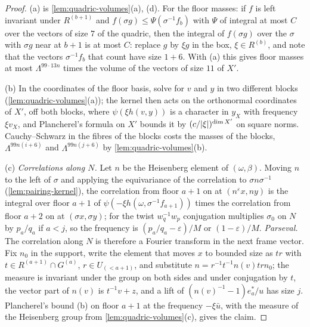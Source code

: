 \begin{proof}
(a) is \cref{lem:quadric-volumes}(a), (d). For the floor masses: if $f$ is left invariant under $R^{(b+1)}$ and $f(\sigma g)\le\Psi(\sigma^{-1}f_b)$ with $\Psi$ of integral at most $C$ over the vectors of size $7$ of the quadric, then the integral of
$f(\sigma g)$ over the $\sigma$ with $\sigma g$ near at $b+1$ is at most $C$: replace $g$ by $\xi g$ in the box, $\xi\in R^{(b)}$, and note that the vectors $\sigma^{-1}f_b$ that count have size $1+6$. With (a) this gives floor masses at most $\Lambda^{99\cdot13n}$ times
the volume of the vectors of size $11$ of $X'$.

(b) In the coordinates of the floor basis, solve for $v$ and $y$ in two different blocks (\cref{lem:quadric-volumes}(a)); the kernel then acts on the orthonormal coordinates of $X'$, off both blocks, where $\psi(\xi h(v,y))$ is a
character in $y_X$ with frequency $\xi v_X$, and Plancherel's formula on $X'$ bounds it by $(c/\lvert \xi\rvert)^{\dim X'}$ on square norms. Cauchy--Schwarz in the fibres of the blocks costs the masses of the blocks, $\Lambda^{99n(i+6)}$ and
$\Lambda^{99n(j+6)}$ by \cref{lem:quadric-volumes}(b).

(c) \emph{Correlations along $N$.} Let $n$ be the Heisenberg element of $(\omega,\beta)$. Moving $n$ to the left of $\sigma$ and applying the equivariance of the correlation to $\sigma n\sigma^{-1}$ (\cref{lem:pairing-kernel}), the correlation from floor $a+1$
on at $(n^\varepsilon x,ny)$ is the integral over floor $a+1$ of $\psi(-\xi h(\omega,\sigma^{-1}f_{a+1}))$ times the correlation from floor $a+2$ on at $(\sigma x,\sigma y)$; for the twist $w_q^{-1}w_p$ conjugation multiplies $\sigma_0$ on $N$ by $p_a/q_a$ if
$a<j$, so the frequency is $(p_a/q_a-\varepsilon)/M$ or $(1-\varepsilon)/M$. \emph{Parseval.} The correlation along $N$ is therefore a Fourier transform in the next frame vector. Fix $n_0$ in the support, write the element that moves
$x$ to bounded size as $tr$ with $t\in R^{(a+1)}\cap G^{(a)}$, $r\in U_{(<a+1)}$, and substitute $n=r^{-1}t^{-1}n(v)trn_0$; the measure is invariant under the group on both sides and under conjugation by $t$, the vector part of $n(v)$ is
$t^{-1}v+z$, and a lift of $(n(v)^{-1}-1)e^*_a/u$ has size $j$. Plancherel's bound (b) on floor $a+1$ at the frequency $-\xi\bar u$, with the measure of the Heisenberg group from \cref{lem:quadric-volumes}(c), gives the claim.
\end{proof}

